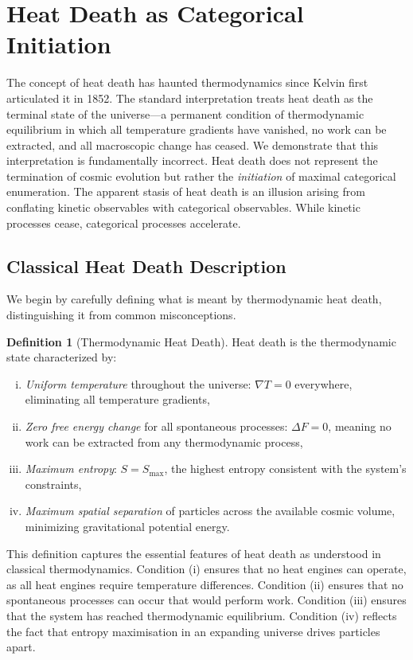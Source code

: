 \documentclass[12pt,a4paper]{article}
\theoremstyle{definition}
\newtheorem{definition}[theorem]{Definition}
\theoremstyle{remark}
\begin{document}
\section{Heat Death as Categorical Initiation}
\label{sec:heat_death}

The concept of heat death has haunted thermodynamics since Kelvin first articulated it in 1852. The standard interpretation treats heat death as the terminal state of the universe—a permanent condition of thermodynamic equilibrium in which all temperature gradients have vanished, no work can be extracted, and all macroscopic change has ceased. We demonstrate that this interpretation is fundamentally incorrect. Heat death does not represent the termination of cosmic evolution but rather the \emph{initiation} of maximal categorical enumeration. The apparent stasis of heat death is an illusion arising from conflating kinetic observables with categorical observables. While kinetic processes cease, categorical processes accelerate.

\subsection{Classical Heat Death Description}

We begin by carefully defining what is meant by thermodynamic heat death, distinguishing it from common misconceptions.

\begin{definition}[Thermodynamic Heat Death]
\label{def:heat_death}
Heat death is the thermodynamic state characterized by:
\begin{enumerate}[(i)]
    \item \emph{Uniform temperature} throughout the universe: $\nabla T = 0$ everywhere, eliminating all temperature gradients,
    \item \emph{Zero free energy change} for all spontaneous processes: $\Delta F = 0$, meaning no work can be extracted from any thermodynamic process,
    \item \emph{Maximum entropy}: $S = S_{\max}$, the highest entropy consistent with the system's constraints,
    \item \emph{Maximum spatial separation} of particles across the available cosmic volume, minimizing gravitational potential energy.
\end{enumerate}
\end{definition}

This definition captures the essential features of heat death as understood in classical thermodynamics. Condition (i) ensures that no heat engines can operate, as all heat engines require temperature differences. Condition (ii) ensures that no spontaneous processes can occur that would perform work. Condition (iii) ensures that the system has reached thermodynamic equilibrium. Condition (iv) reflects the fact that entropy maximisation in an expanding universe drives particles apart.
\end{document}
